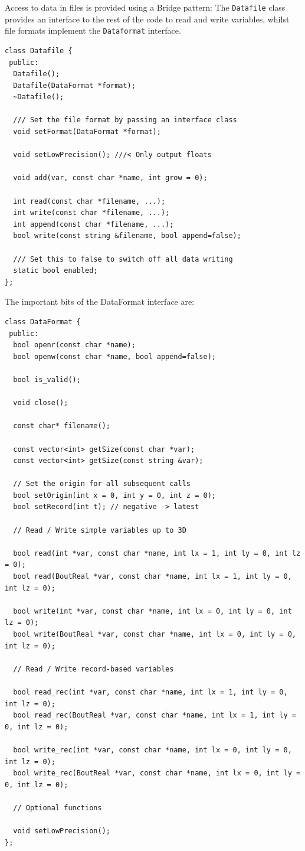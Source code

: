 \documentclass[12pt]{article}
\newcommand{\code}[1]{\texttt{#1}}
\begin{document}
Access to data in files is provided using a Bridge pattern: The
\code{Datafile} class provides an interface to the rest of the code
to read and write variables, whilst file formats implement the
\code{Dataformat} interface. 
\begin{lstlisting}
class Datafile {
 public:
  Datafile();
  Datafile(DataFormat *format);
  ~Datafile();
  
  /// Set the file format by passing an interface class
  void setFormat(DataFormat *format);

  void setLowPrecision(); ///< Only output floats

  void add(var, const char *name, int grow = 0);

  int read(const char *filename, ...);
  int write(const char *filename, ...);
  int append(const char *filename, ...);
  bool write(const string &filename, bool append=false);

  /// Set this to false to switch off all data writing
  static bool enabled;
};
\end{lstlisting}


The important bits of the DataFormat interface are: 
\begin{lstlisting}
class DataFormat {
 public:
  bool openr(const char *name);
  bool openw(const char *name, bool append=false);
  
  bool is_valid();
  
  void close();
  
  const char* filename();

  const vector<int> getSize(const char *var);
  const vector<int> getSize(const string &var);

  // Set the origin for all subsequent calls
  bool setOrigin(int x = 0, int y = 0, int z = 0); 
  bool setRecord(int t); // negative -> latest
  
  // Read / Write simple variables up to 3D

  bool read(int *var, const char *name, int lx = 1, int ly = 0, int lz = 0);
  bool read(BoutReal *var, const char *name, int lx = 1, int ly = 0, int lz = 0);

  bool write(int *var, const char *name, int lx = 0, int ly = 0, int lz = 0);
  bool write(BoutReal *var, const char *name, int lx = 0, int ly = 0, int lz = 0);

  // Read / Write record-based variables

  bool read_rec(int *var, const char *name, int lx = 1, int ly = 0, int lz = 0);
  bool read_rec(BoutReal *var, const char *name, int lx = 1, int ly = 0, int lz = 0);

  bool write_rec(int *var, const char *name, int lx = 0, int ly = 0, int lz = 0);
  bool write_rec(BoutReal *var, const char *name, int lx = 0, int ly = 0, int lz = 0);

  // Optional functions
  
  void setLowPrecision();
};
\end{lstlisting}
\end{document}
